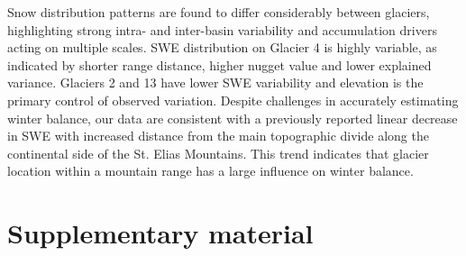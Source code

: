 \documentclass[review,oneside, letterpaper]{igs}
\begin{document}
Snow distribution patterns are found to differ considerably between glaciers, highlighting strong intra- and inter-basin variability and accumulation drivers acting on multiple scales. SWE distribution on Glacier 4 is highly variable, as indicated by shorter range distance, higher nugget value and lower explained variance. Glaciers 2 and 13 have lower SWE variability and elevation is the primary control of observed variation. Despite challenges in accurately estimating winter balance, our data are consistent with a previously reported linear decrease in SWE with increased distance from the main topographic divide along the continental side of the St. Elias Mountains. This trend indicates that glacier location within a mountain range has a large influence on winter balance. 

%

%


\pagebreak 
\section{Supplementary material}
\end{document}
